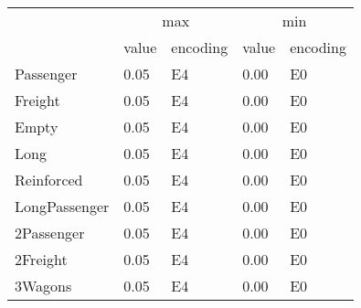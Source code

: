 \begin{tabular}{lllll}
\toprule
 & \multicolumn{2}{c}{max} & \multicolumn{2}{c}{min} \\
 & value & encoding & value & encoding \\
\midrule
Passenger & 0.05 & E4 & 0.00 & E0 \\
Freight & 0.05 & E4 & 0.00 & E0 \\
Empty & 0.05 & E4 & 0.00 & E0 \\
Long & 0.05 & E4 & 0.00 & E0 \\
Reinforced & 0.05 & E4 & 0.00 & E0 \\
LongPassenger & 0.05 & E4 & 0.00 & E0 \\
2Passenger & 0.05 & E4 & 0.00 & E0 \\
2Freight & 0.05 & E4 & 0.00 & E0 \\
3Wagons & 0.05 & E4 & 0.00 & E0 \\
\bottomrule
\end{tabular}
